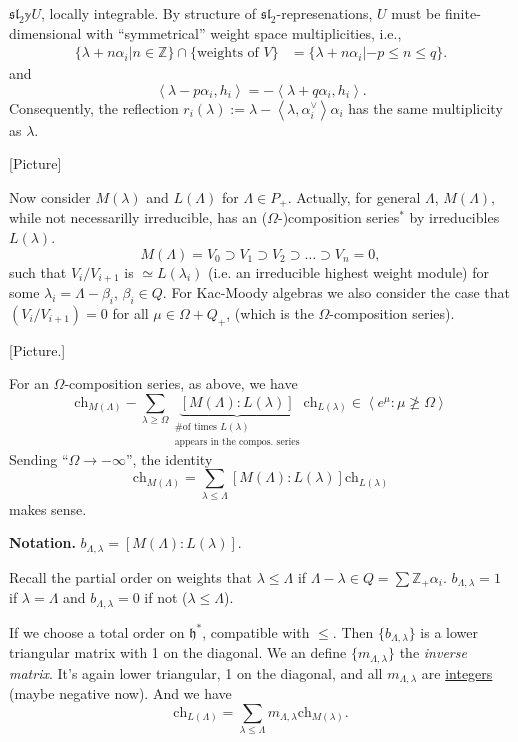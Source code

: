 $\mathfrak{sl}_2\mathbb{y}U$, locally integrable. By structure of
$\mathfrak{sl}_2$-represenations, $U$ must be finite-dimensional
with ``symmetrical'' weight space multiplicities, i.e.,
\begin{align*}
\{\lambda+n\alpha_i|n\in\mathbb{Z}\}\cap \{\text{weights of }V\}
&=\{\lambda+n\alpha_i|-p\leq n\leq q\}.
\end{align*}
and
$$
\left<\lambda-p\alpha_i,h_i\right>=-\left<\lambda+q\alpha_i,h_i\right>.
$$
\medskip\noindent
Consequently, the reflection
$r_i(\lambda):=\lambda-\left<\lambda,\alpha_i^\vee\right>\alpha_i$
has the same multiplicity as $\lambda$.

[Picture]

Now consider $M(\lambda)$ and $L(\Lambda)$ for 
$\Lambda \in P_+$.
Actually, for general $\Lambda$, $M(\Lambda)$, while not
necessarilly irreducible, has an
($\Omega$-)composition series$^*$ by 
irreducibles $L(\lambda)$.
$$
M(\Lambda)=V_0 \supset V_1 \supset V_2 \supset \ldots \supset V_n=0,
$$
such that $V_i/V_{i+1}$ is $\simeq L(\lambda_i)$ (i.e. an irreducible highest
weight module) for some $\lambda_i=\Lambda-\beta_i$, $\beta_i \in Q$. For
Kac-Moody algebras we also consider the case that $(V_i/V_{i+1})=0$ for all
$\mu \in \Omega + Q_+$, (which is the $\Omega$-composition series).

[Picture.]

For an $\Omega$-composition series, as above, we have
$$
\text{ch}_{M(\Lambda)}-\sum_{\lambda \geq \Omega}
\underbrace{[M(\Lambda):L(\lambda)]}
_{\substack{\text{\# of times $L(\lambda)$} \\ \text{
appears in the compos. series}}}
\text{ch}_{L(\lambda)}
\in \left<e^{\mu}:\mu \not \geq \Omega\right>
$$
Sending  ``$\Omega \to -\infty$'', the identity
$$
\text{ch}_{M(\Lambda)}=\sum_{\lambda \leq  \Lambda}
[M(\Lambda):L(\lambda)]\text{ch}_{L(\lambda)}
$$
makes sense.

{\bf Notation.} $b_{\Lambda,\lambda}=[M(\Lambda):L(\lambda)]$.

\begin{remark}
\label{remark-total-order-on-hstar}
Recall the partial order on weights that $\lambda \leq \Lambda$ if 
$\Lambda-\lambda \in Q= \sum \mathbb{Z}_+\alpha_i$.
$b_{\Lambda,\lambda}=1$ if $\lambda = \Lambda$ and 
$b_{\Lambda,\lambda}=0$ if not ($\lambda \leq  \Lambda$).

If we choose a total order on $\mathfrak{h}^*$, compatible with $\leq$.
Then $\{b_{\Lambda,\lambda}\}$ is a lower triangular matrix with 1 
on the diagonal.
We an define $\{m_{\Lambda,\lambda}\}$ the {\it inverse matrix}.
It's again lower triangular, 1 on the diagonal, and all
$m_{\Lambda,\lambda}$ are \underline{integers} (maybe negative now). 
And we have
\begin{equation}
\label{equation-character}
\text{ch}_{L(\Lambda)}=\sum_{\lambda \leq  \Lambda}m_{\Lambda,\lambda}
\text{ch}_{M(\lambda)}.
\end{equation}
\end{remark}

